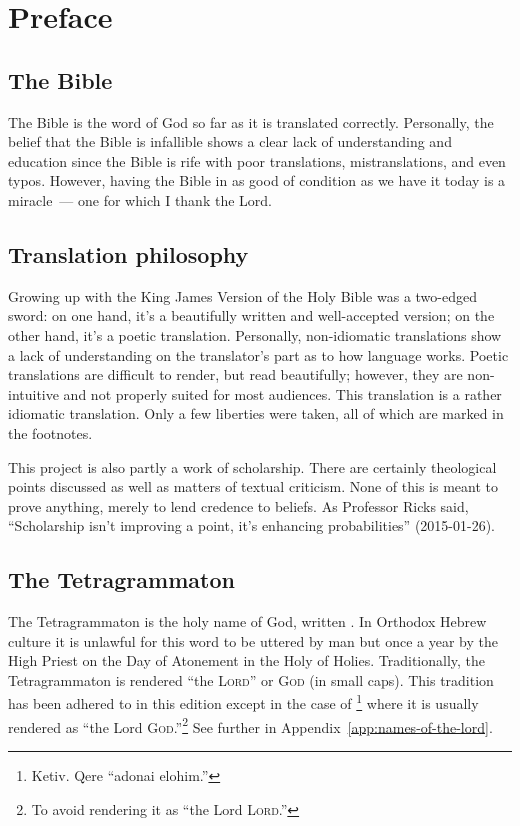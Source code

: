 \chapter{Preface}\thispagestyle{empty}
\section{The Bible}
The Bible is the word of God so far as it is translated correctly. Personally, the belief that the Bible is infallible shows a clear lack of understanding and education since the Bible is rife with poor translations, mistranslations, and even typos. However, having the Bible in as good of condition as we have it today is a miracle~--- one for which I thank the Lord.

\section{Translation philosophy}
Growing up with the King James Version of the Holy Bible was a two-edged sword: on one hand, it's a beautifully written and well-accepted version; on the other hand, it's a poetic translation. Personally, non-idiomatic translations show a lack of understanding on the translator's part as to how language works. Poetic translations are difficult to render, but read beautifully; however, they are non-intuitive and not properly suited for most audiences. This translation is a rather idiomatic translation. Only a few liberties were taken, all of which are marked in the footnotes.

This project is also partly a work of scholarship. There are certainly theological points discussed as well as matters of textual criticism. None of this is meant to prove anything, merely to lend credence to beliefs. As Professor Ricks said, ``Scholarship isn't improving a point, it's enhancing probabilities'' (2015-01-26).

\section{The Tetragrammaton}
The Tetragrammaton is the holy name of God, written . In Orthodox Hebrew culture it is unlawful for this word to be uttered by man but once a year by the High Priest on the Day of Atonement in the Holy of Holies. Traditionally, the Tetragrammaton is rendered ``the \textsc{Lord}'' or \textsc{God} (in small caps). This tradition has been adhered to in this edition except in the case of \footnote{Ketiv. Qere ``adonai elohim.''} where it is usually rendered as ``the Lord \textsc{God}.''\footnote{To avoid rendering it as ``the Lord \textsc{Lord}.''} See further in Appendix~\ref{app:names-of-the-lord}.

